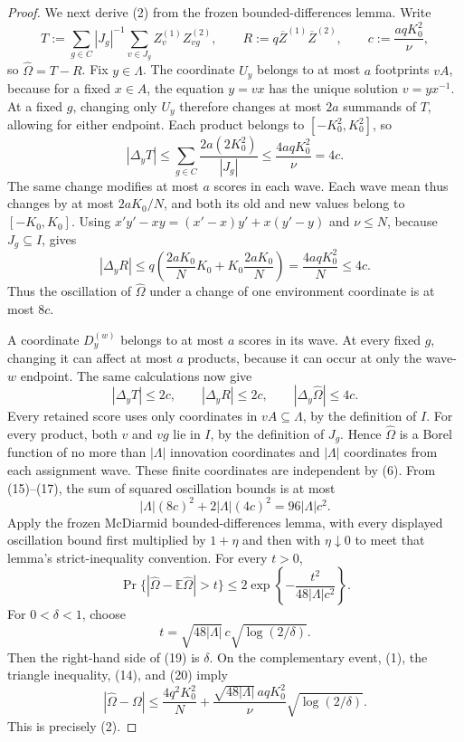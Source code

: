 \documentclass{article}
\begin{document}
\begin{proof}
We next derive (2) from the frozen bounded-differences lemma.  Write
\[
 T:=\sum_{g\in C}|J_g|^{-1}\sum_{v\in J_g}
 Z_v^{(1)}Z_{vg}^{(2)},
 \qquad
 R:=q\overline Z^{(1)}\overline Z^{(2)},
 \qquad
 c:=\frac{aqK_0^2}{\nu}, \tag{14}
\]
so \(\widehat\Omega=T-R\).  Fix \(y\in\Lambda\).  The coordinate \(U_y\) belongs to at most \(a\) footprints \(vA\), because for a fixed \(x\in A\), the equation \(y=vx\) has the unique solution \(v=yx^{-1}\).  At a fixed \(g\), changing only \(U_y\) therefore changes at most \(2a\) summands of \(T\), allowing for either endpoint.  Each product belongs to \([-K_0^2,K_0^2]\), so
\[
 |\Delta_yT|
 \le\sum_{g\in C}\frac{2a(2K_0^2)}{|J_g|}
 \le\frac{4aqK_0^2}{\nu}=4c. \tag{15}
\]
The same change modifies at most \(a\) scores in each wave.  Each wave mean thus changes by at most \(2aK_0/N\), and both its old and new values belong to \([-K_0,K_0]\).  Using \(x'y'-xy=(x'-x)y'+x(y'-y)\) and \(\nu\le N\), because \(J_g\subseteq I\), gives
\[
 |\Delta_yR|
 \le q\left(\frac{2aK_0}{N}K_0
             +K_0\frac{2aK_0}{N}\right)
 =\frac{4aqK_0^2}{N}
 \le4c. \tag{16}
\]
Thus the oscillation of \(\widehat\Omega\) under a change of one environment coordinate is at most \(8c\).

A coordinate \(D_y^{(w)}\) belongs to at most \(a\) scores in its wave.  At every fixed \(g\), changing it can affect at most \(a\) products, because it can occur at only the wave-\(w\) endpoint.  The same calculations now give
\[
 |\Delta_yT|\le2c,
 \qquad
 |\Delta_yR|\le2c,
 \qquad
 |\Delta_y\widehat\Omega|\le4c. \tag{17}
\]
Every retained score uses only coordinates in \(vA\subseteq\Lambda\), by the definition of \(I\).  For every product, both \(v\) and \(vg\) lie in \(I\), by the definition of \(J_g\).  Hence \(\widehat\Omega\) is a Borel function of no more than \(|\Lambda|\) innovation coordinates and \(|\Lambda|\) coordinates from each assignment wave.  These finite coordinates are independent by (6).  From (15)--(17), the sum of squared oscillation bounds is at most
\[
 |\Lambda|(8c)^2+2|\Lambda|(4c)^2
 =96|\Lambda|c^2. \tag{18}
\]
Apply the frozen McDiarmid bounded-differences lemma, with every displayed oscillation bound first multiplied by \(1+\eta\) and then with \(\eta\downarrow0\) to meet that lemma's strict-inequality convention.  For every \(t>0\),
\[
 \Pr\{ |\widehat\Omega-\mathbb E\widehat\Omega|>t\}
 \le2\exp\!\left\{-\frac{t^2}{48|\Lambda|c^2}\right\}. \tag{19}
\]
For \(0<\delta<1\), choose
\[
 t=\sqrt{48|\Lambda|}\,c\sqrt{\log(2/\delta)}. \tag{20}
\]
Then the right-hand side of (19) is \(\delta\).  On the complementary event, (1), the triangle inequality, (14), and (20) imply
\[
 |\widehat\Omega-\Omega|
 \le \frac{4q^2K_0^2}{N}
 +\frac{\sqrt{48|\Lambda|}\,aqK_0^2}{\nu}
   \sqrt{\log(2/\delta)}.
\]
This is precisely (2).


\end{proof}
\end{document}
